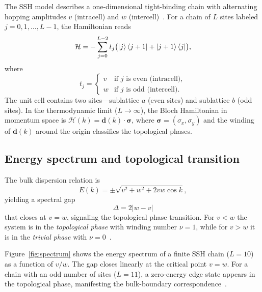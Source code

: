 \documentclass[
  reprint,
  amsmath,
  amssymb,
  aps,
  prb,
  floatfix,
  longbibliography,
]{revtex4-2}
\begin{document}
The SSH model describes a one-dimensional tight-binding chain with alternating
hopping amplitudes $v$ (intracell) and $w$ (intercell)~\cite{SSH1979,SSH1980}.
For a chain of $L$ sites labeled $j = 0, 1, \ldots, L-1$, the Hamiltonian reads
\begin{equation}
  \mathcal{H} = -\sum_{j=0}^{L-2} t_j
  \bigl(\ket{j}\bra{j+1} + \ket{j+1}\bra{j}\bigr),
  \label{eq:ssh_ham}
\end{equation}
where
\begin{equation}
  t_j =
  \begin{cases}
    v & \text{if } j \text{ is even (intracell)}, \\
    w & \text{if } j \text{ is odd (intercell)}.
  \end{cases}
  \label{eq:hoppings}
\end{equation}
The unit cell contains two sites---sublattice $a$ (even sites) and sublattice $b$
(odd sites). In the thermodynamic limit ($L \to \infty$), the Bloch Hamiltonian
in momentum space is $\mathcal{H}(k) = \bm{d}(k) \cdot \bm{\sigma}$, where
$\bm{\sigma} = (\sigma_x, \sigma_y)$ and the winding of $\bm{d}(k)$ around the
origin classifies the topological phases.

\subsection{Energy spectrum and topological transition}
\label{sec:spectrum}

The bulk dispersion relation is
\begin{equation}
  E(k) = \pm\sqrt{v^2 + w^2 + 2vw\cos k},
  \label{eq:dispersion}
\end{equation}
yielding a spectral gap
\begin{equation}
  \Delta = 2|w - v|
  \label{eq:gap}
\end{equation}
that closes at $v = w$, signaling the topological phase transition. For $v < w$
the system is in the \emph{topological phase} with winding number $\nu = 1$,
while for $v > w$ it is in the \emph{trivial phase} with $\nu = 0$~\cite{Zak1989, Asboth2016}.

Figure~\ref{fig:spectrum} shows the energy spectrum of a finite SSH chain
($L = 10$) as a function of $v/w$. The gap closes linearly at the critical point
$v = w$. For a chain with an odd number of sites ($L = 11$), a zero-energy edge
state appears in the topological phase, manifesting the bulk-boundary
correspondence~\cite{Prodan2016}.
\end{document}
